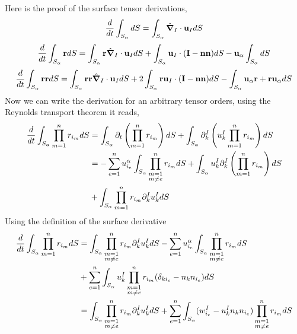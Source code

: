 Here is the proof of the surface tensor derivations,
\begin{equation*}
    \frac{d}{d t} \int_{S_\alpha} dS 
    = \int_{S_\alpha} \hat{\bm{\nabla}}_I \cdot \textbf{u}_I dS
\end{equation*}
\begin{equation*}
    \frac{d}{d t} \int_{S_\alpha} \textbf{r} dS 
    = \int_{S_\alpha} \textbf{r} \hat{\bm{\nabla}}_I \cdot \textbf{u}_I dS
    + \int_{S_\alpha} \textbf{u}_I  \cdot (\textbf{I}-\textbf{nn}) dS
    - \textbf{u}_\alpha \int_{S_\alpha} dS
\end{equation*}
\begin{equation*}
    \frac{d}{d t} \int_{S_\alpha} \textbf{rr} dS 
    = \int_{S_\alpha} \textbf{rr} \hat{\bm{\nabla}}_I \cdot \textbf{u}_I dS
    + 2 \int_{S_\alpha}\textbf{r} \textbf{u}_I  \cdot (\textbf{I}-\textbf{nn}) dS
    - \int_{S_\alpha} \textbf{u}_\alpha \textbf{r} + \textbf{r}  \textbf{u}_\alpha dS
\end{equation*}
Now we can write the derivation for an arbitrary tensor orders, using the Reynolds transport theorem it reads, 
\begin{align*}
    \frac{d}{d t} \int_{S_\alpha} \prod_{m=1}^{n} r_{i_m}dS
    &= \int_{S_\alpha} \partial_t \left(
        \prod_{m=1}^{n} r_{i_m}
    \right) dS
    + \int_{S_\alpha} 
    \partial_k^I  \left(
        u^I_k \prod_{m=1}^{n} r_{i_m}
    \right)dS \\
    &= - \sum_{e=1}^n u^\alpha_{i_e} \int_{S_\alpha} 
        \prod_{\substack{m = 1 \\m \neq e}}^{n} r_{i_m}
     dS
    + \int_{S_\alpha} u^I_k
    \partial_k^I  \left(
         \prod_{m=1}^{n} r_{i_m}
    \right)dS \\
    &+ \int_{S_\alpha} 
    \prod_{m=1}^{n} r_{i_m}
    \partial_k^I u^I_k 
    dS \\
\end{align*}
Using the definition of the surface derivative
\begin{align*}
    \frac{d}{d t} \int_{S_\alpha} \prod_{m=1}^{n} r_{i_m}dS
    &= \int_{S_\alpha} 
    \prod_{\substack{m = 1 \\m \neq e}}^{n} r_{i_m}
    \partial_k^I u^I_k 
    dS 
    - \sum_{e=1}^n u^\alpha_{i_e} \int_{S_\alpha} 
    \prod_{\substack{m = 1 \\m \neq e}}^{n} r_{i_m}dS \\
    &+ \sum_{e=1}^n \int_{S_\alpha} u^I_k
    \prod_{\substack{m = 1 \\m \neq e}}^{n} r_{i_m}
    (\delta_{ki_e} - n_kn_{i_e}) dS \\
    &= \int_{S_\alpha} 
    \prod_{\substack{m = 1 \\m \neq e}}^{n} r_{i_m}
    \partial_k^I u^I_k dS 
    + \sum_{e=1}^n  \int_{S_\alpha} (w^I_{i_e} - u^I_kn_kn_{i_e}) 
    \prod_{\substack{m = 1 \\m \neq e}}^{n} r_{i_m}dS \\
\end{align*}
